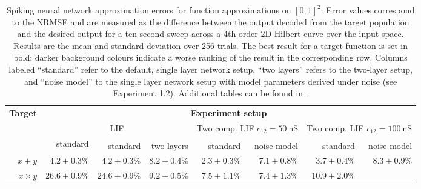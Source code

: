 \begin{table}[t]
	\caption[Spiking neural network approximation errors.]{Spiking neural network approximation errors for function approximations on $[0, 1]^2$. Error values correspond to the NRMSE and are measured as the difference between the output decoded from the target population and the desired output for a ten second sweep across a 4th order 2D Hilbert curve over the input space. Results are the mean and standard deviation over 256 trials. The best result for a target function is set in bold; darker background colours indicate a worse ranking of the result in the corresponding row. Columns labeled \enquote{standard} refer to the default, single layer network setup, \enquote{two layers} refers to the two-layer setup, and \enquote{noise model} to the single layer network setup with model parameters derived under noise (see Experiment 1.2). Additional tables can be found in .}
	\fontsize{9.5pt}{12pt}\selectfont
	\sffamily
	\renewcommand\arraystretch{1.5}
	\centering
	\begin{tabular}{r r r r r r r r }
	\toprule
	\textbf{Target}& \multicolumn{7}{c}{\textbf{Experiment setup}} \\
	\cmidrule(r){1-1}\cmidrule(l){2-8}
	& \multicolumn{3}{c}{%
	LIF}
	& \multicolumn{2}{c}{%
	Two comp. LIF $c_{12} = \SI{50}{\nano\siemens}$}
	& \multicolumn{2}{c}{%
	Two comp. LIF $c_{12} = \SI{100}{\nano\siemens}$}
	\\
	\cmidrule(l){2-4}
	\cmidrule(l){5-6}
	\cmidrule(l){7-8}
	& standard
	& standard\textsuperscript{\dag}
	& two layers\textsuperscript{\dag}
	& %
	standard\textsuperscript{\dag}
	& %
	noise model\textsuperscript{\dag}
	& %
	standard\textsuperscript{\dag}
	& %
	noise model\textsuperscript{\dag}
	\\
	\midrule
	$x + y$ 
	& \cellcolor{White!72!SteelBlue}$4.2 \pm 0.3\%$
	& \cellcolor{White!58!SteelBlue}$4.2 \pm 0.3\%$
	& \cellcolor{White!29!SteelBlue}$8.2 \pm 0.4\%$
	& \cellcolor{White!100!SteelBlue}$\mathbf{2.3 \pm 0.3\%}$
	& \cellcolor{White!43!SteelBlue}$7.1 \pm 0.8\%$
	& \cellcolor{White!86!SteelBlue}$3.7 \pm 0.4\%$
	& \cellcolor{White!15!SteelBlue}$8.3 \pm 0.9\%$
	\\
	$x \times y$ 
	& \cellcolor{White!15!SteelBlue}$26.6 \pm 0.9\%$
	& \cellcolor{White!29!SteelBlue}$24.6 \pm 0.9\%$
	& \cellcolor{White!72!SteelBlue}$9.2 \pm 0.5\%$
	& \cellcolor{White!86!SteelBlue}$7.5 \pm 1.1\%$
	& \cellcolor{White!100!SteelBlue}$\mathbf{7.4 \pm 1.3\%}$
	& \cellcolor{White!43!SteelBlue}$10.9 \pm 2.0\%$

\end{tabular}
\end{table}
